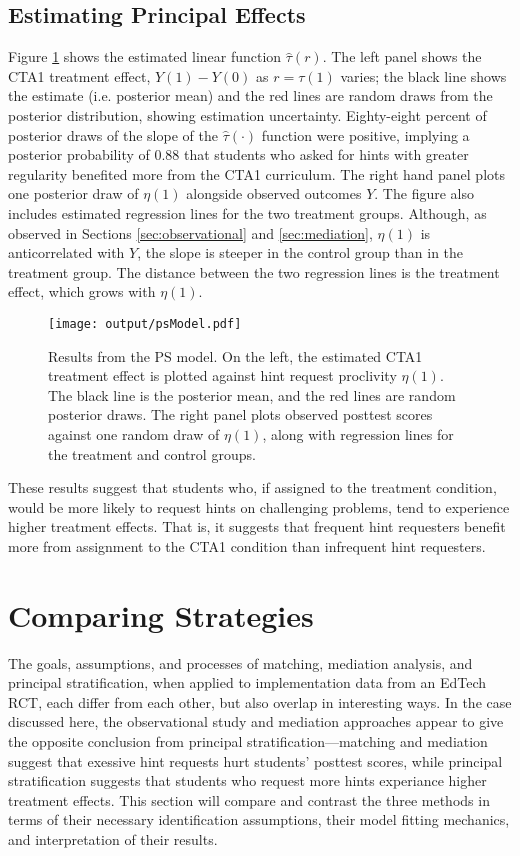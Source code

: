 \documentclass{article}\usepackage[]{graphicx}\usepackage[]{color}
\begin{document}
\subsection{Estimating Principal Effects}\label{sec:PSest}

Figure \ref{fig:psResults} shows the estimated linear function
$\hat{\tau}(r)$.
The left panel shows the CTA1 treatment effect, $Y(1)-Y(0)$ as
$r=\tau(1)$ varies; the black line shows the estimate (i.e. posterior
mean) and the red lines are random draws from the posterior
distribution, showing estimation uncertainty.
Eighty-eight percent of posterior draws of the slope of the
$\hat{\tau}(\cdot)$ function were positive, implying a posterior
probability of 0.88 that students who asked for hints
with greater regularity benefited more from the CTA1 curriculum.
The right hand panel plots one posterior draw of $\eta(1)$
alongside observed outcomes $Y$.
The figure also includes estimated regression lines for the two
treatment groups.
Although, as observed in Sections \ref{sec:observational} and
\ref{sec:mediation}, $\eta(1)$ is anticorrelated with $Y$, the slope
is steeper in the control group than in the treatment group.
The distance between the two regression lines is the treatment effect,
which grows with $\eta(1)$.

\begin{figure}
\centering
\texttt{[image: output/psModel.pdf]}
\caption{Results from the PS model. On the left, the estimated
  CTA1 treatment effect is plotted against hint request proclivity
  $\eta(1)$. The black line is the posterior mean, and the red lines
  are random posterior draws. The right panel plots observed posttest
  scores against one random draw of $\eta(1)$, along with regression
  lines for the treatment and control groups.}
\label{fig:psResults}
\end{figure}

These results suggest that students who, if assigned to the treatment
condition, would be more likely to request hints on challenging
problems, tend to experience higher treatment effects.
That is, it suggests that frequent hint requesters benefit more from
assignment to the CTA1 condition than infrequent hint requesters.

\section{Comparing Strategies}\label{sec:synthesis}
The goals, assumptions, and processes of matching, mediation analysis,
and principal stratification, when applied to implementation data from
an EdTech RCT, each differ from each other, but also overlap in
interesting ways.
In the case discussed here, the observational study and mediation
approaches appear to give the opposite conclusion from principal
stratification---matching and mediation suggest that exessive hint
requests hurt students' posttest scores, while principal
stratification suggests that students who request more hints
experiance higher treatment effects.
This section will compare and contrast the three methods in terms of
 their necessary identification assumptions, their model fitting
 mechanics, and interpretation of their results.
\end{document}
